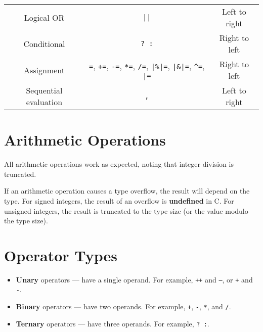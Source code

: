 \documentclass{report}
\begin{document}
\begin{table}[H]
\begin{tabular}{c c c}
        Logical OR                    & \texttt{||}                                                                                                                                                                                                        & Left to right                  \\
        Conditional                   & \texttt{? :}                                                                                                                                                                                                       & Right to left                  \\ %
        Assignment                    & \texttt{=}, \texttt{+=}, \texttt{-=}, \texttt{*=}, \texttt{/=}, \texttt{|\%|=}, \texttt{|\&|=}, \texttt{^=}, \texttt{|=} & Right to left                  \\
        Sequential evaluation         & \texttt{,}                                                                                                                                                                                                         & Left to right                  \\
        \bottomrule
    \end{tabular}
\end{table}
\section{Arithmetic Operations}
All arithmetic operations work as expected, noting that integer
division is truncated.

If an arithmetic operation causes a type overflow, the result will
depend on the type. For signed integers, the result of an overflow is
\textbf{undefined} in C. For unsigned integers, the result is truncated
to the type size (or the value modulo the type size).
\section{Operator Types}
\begin{itemize}
    \item \textbf{Unary} operators --- have a single operand. For example, \texttt{++} and \texttt{--}, or \texttt{+} and \texttt{-}.
    \item \textbf{Binary} operators --- have two operands. For example, \texttt{+}, \texttt{-}, \texttt{*}, and \texttt{/}.
    \item \textbf{Ternary} operators --- have three operands. For example, \texttt{? :}. %
\end{itemize}
\end{document}
